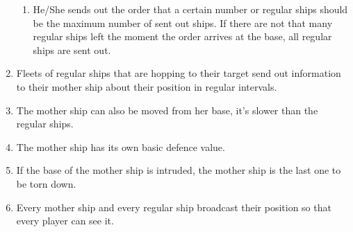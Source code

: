 \begin{enumerate}
\begin{enumerate}[label=\alph*]
			\item He/She sends out the order that a certain number or regular ships should be the maximum number of sent out ships. If there are not that many regular ships left the moment the order arrives at the base, all regular ships are sent out.
		\end{enumerate}
	\item Fleets of regular ships that are hopping to their target send out information to their mother ship about their position in regular intervals.
	\item The mother ship can also be moved from her base, it's slower than the regular ships.
	\item The mother ship has its own basic defence value.
	\item If the base of the mother ship is intruded, the mother ship is the last one to be torn down.
	\item Every mother ship and every regular ship broadcast their position so that every player can see it.
\end{enumerate}